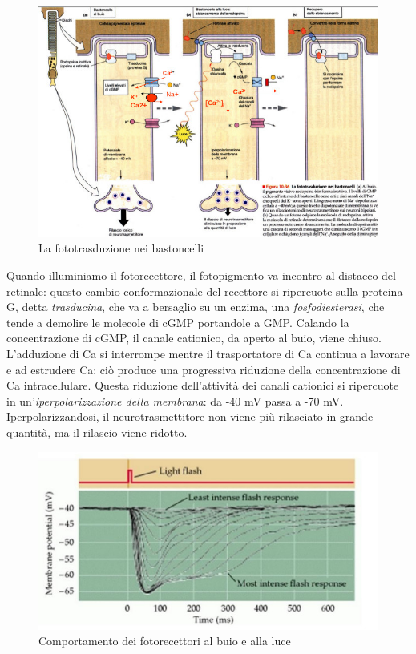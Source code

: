 \documentclass[a4paper,12pt]{article}
\begin{document}
\begin{figure}[H]
\centering
\includegraphics[scale=0.45]{immagine/fototrasduzione.jpg}
\caption{La fototrasduzione nei bastoncelli}
\end{figure} 

Quando illuminiamo il fotorecettore, il fotopigmento va incontro al distacco del retinale: questo cambio conformazionale del recettore si ripercuote sulla proteina G, detta \emph{trasducina}, che va a bersaglio su un enzima, una \emph{fosfodiesterasi}, che tende a demolire le molecole di cGMP portandole a GMP. Calando la concentrazione di cGMP, il canale cationico, da aperto al buio, viene chiuso. L'adduzione di Ca si interrompe mentre il trasportatore di Ca continua a lavorare e ad estrudere Ca: ciò produce una progressiva riduzione della concentrazione di Ca intracellulare. Questa riduzione dell'attività dei canali cationici si ripercuote in un'\emph{iperpolarizzazione della membrana}: da -40 mV passa a -70 mV. Iperpolarizzandosi, il neurotrasmettitore non viene più rilasciato in grande quantità, ma il rilascio viene ridotto.

\begin{figure}[H]
\centering
\includegraphics[scale=0.45]{immagine/foto2.jpg}
\caption{Comportamento dei fotorecettori al buio e alla luce}
\end{figure} 
\end{document}
